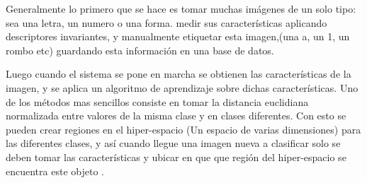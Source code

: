 \documentclass{article}
\begin{document}
	Generalmente lo primero que se hace es tomar muchas imágenes de un solo tipo: sea una letra, un 
	numero o una forma. medir sus características aplicando
	descriptores invariantes, y manualmente etiquetar esta imagen,(una a, un 1, un rombo etc) 
	guardando esta información en una base de datos. 
	
	Luego cuando el sistema se pone en marcha se obtienen las características de la imagen, y se
	aplica un algoritmo de aprendizaje sobre dichas características. Uno de los métodos mas
	sencillos consiste en tomar la distancia euclidiana normalizada entre valores de la misma
	clase y en clases diferentes. Con esto se pueden crear regiones en el hiper-espacio (Un
	espacio de varias dimensiones) para las diferentes clases, y así cuando llegue una imagen
	nueva a clasificar solo se deben tomar las características y ubicar en que que región del
	hiper-espacio se encuentra este objeto \cite{learn1}.
		
	
\end{document}
